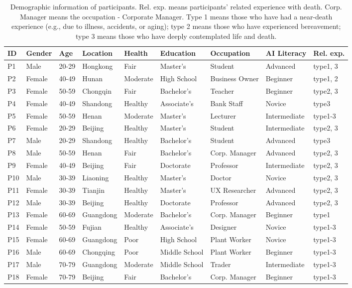 \begin{table*}[htbp]
  \caption{Demographic information of participants. Rel. exp. means participants' related experience with death. Corp. Manager means the occupation - Corporate Manager. Type 1 means those who have had a near-death experience (e.g., due to illness, accidents, or aging); type 2 means those who have experienced bereavement; type 3 means those who have deeply contemplated life and death. }
  \label{tab:demographicinfo}
  \begin{tabular}{lllllllll}
    \toprule
    ID & Gender & Age & Location & Health & Education & Occupation & AI Literacy & Rel. exp. \\
    \midrule
    P1 & Male & 20-29 & Hongkong & Fair & Master's & Student & Advanced & type1, 3 \\
    P2 & Female & 40-49 & Hunan & Moderate & High School & Business Owner & Beginner & type1, 2 \\
    P3 & Female & 50-59 & Chongqin & Fair & Bachelor's & Teacher & Beginner & type2, 3 \\
    P4 & Female & 40-49 & Shandong & Healthy & Associate's & Bank Staff & Novice & type3 \\
    P5 & Female & 50-59 & Henan & Moderate & Master's & Lecturer & Intermediate & type1-3 \\
    P6 & Female & 20-29 & Beijing & Healthy & Master's & Student & Intermediate & type2, 3 \\
    P7 & Male & 20-29 & Shandong & Healthy & Bachelor's & Student & Advanced & type3 \\
    P8 & Male & 50-59 & Henan & Fair & Bachelor's & Corp. Manager & Advanced & type2, 3 \\
    P9 & Female & 40-49 & Beijing & Fair & Doctorate & Professor & Intermediate & type2, 3 \\
    P10 & Male & 30-39 & Liaoning & Healthy & Master's & Doctor & Novice & type2, 3 \\
    P11 & Female & 30-39 & Tianjin & Healthy & Master's & UX Researcher & Advanced & type2, 3 \\
    P12 & Male & 30-39 & Beijing & Healthy & Doctorate & Professor & Advanced & type2, 3 \\
    P13 & Female & 60-69 & Guangdong & Moderate & Bachelor's & Corp. Manager & Beginner & type1 \\
    P14 & Female & 50-59 & Fujian & Healthy & Associate's & Designer & Novice & type1-3 \\
    P15 & Female & 60-69 & Guangdong & Poor & High School & Plant Worker & Novice & type1-3 \\
    P16 & Male & 60-69 & Chongqing & Poor & Middle School & Plant Worker & Beginner & type1-3 \\
    P17 & Male & 70-79 & Guangdong & Moderate & Middle School & Trader & Intermediate & type1-3 \\
    P18 & Female & 70-79 & Beijing & Fair & Bachelor's & Corp. Manager & Beginner & type1-3 \\
  \bottomrule
\end{tabular}
\end{table*}

